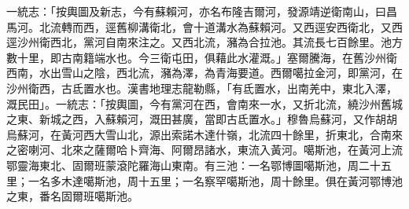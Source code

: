 \begin{pinyinscope}
一統志：「按輿圖及新志，今有蘇賴河，亦名布隆吉爾河，發源靖逆衛南山，曰昌馬河。北流轉而西，逕舊柳溝衛北，會十道溝水為蘇賴河。又西逕安西衛北，又西逕沙州衛西北，黨河自南來注之。又西北流，瀦為合拉池。其流長七百餘里。池方數十里，即古南籍端水也。今三衛屯田，俱藉此水灌溉。」塞爾騰海，在舊沙州衛西南，水出雪山之陰，西北流，瀦為澤，為青海要道。西爾噶拉金河，即黨河，在沙州衛西，古氐置水也。漢書地理志龍勒縣，「有氐置水，出南羌中，東北入澤，溉民田」。一統志：「按輿圖，今有黨河在西，會南來一水，又折北流，繞沙州舊城之東、新城之西，入蘇賴河，溉田甚廣，當即古氐置水。」穆魯烏蘇河，又作胡胡烏蘇河，在黃河西大雪山北，源出索諾木達什嶺，北流四十餘里，折東北，合南來之密喇河、北來之薩爾哈卜齊海、阿爾昂諸水，東流入黃河。噶斯池，在黃河上流鄂靈海東北、固爾班蒙滾陀羅海山東南。有三池：一名鄂博圖噶斯池，周二十五里；一名多木達噶斯池，周十五里；一名察罕噶斯池，周十餘里。俱在黃河鄂博池之東，番名固爾班噶斯池。


\end{pinyinscope}
